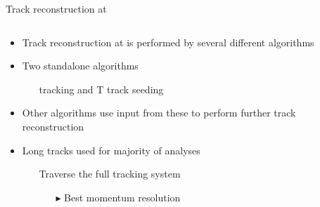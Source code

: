 \documentclass[aspectratio=1610]{beamer}
\begin{document}
\begin{frame}{Track reconstruction at \lhcb}

\begin{columns}
\begin{column}{0.5\textwidth}
\begin{itemize}
\item Track reconstruction at \lhcb is performed by several different algorithms
\item Two standalone algorithms 
  \begin{itemize}
    \item[\ding{70}] \velo tracking and T track seeding
  \end{itemize}
\item Other algorithms use input from these to perform further track reconstruction
\item Long tracks used for majority of \lhcb analyses
  \begin{itemize}
    \item[\ding{70}] Traverse the full tracking system
    \begin{itemize}
    \item[$\blacktriangleright$] Best momentum resolution
    \end{itemize}
  \end{itemize}
\end{itemize}
\end{column}
\begin{column}{0.5\textwidth}
\end{column}
\end{columns}
\end{frame}
\end{document}
